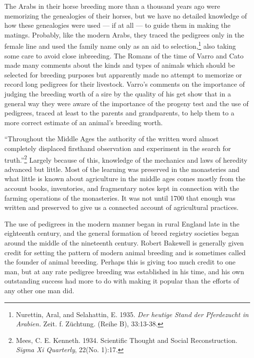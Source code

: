 The Arabs in their horse breeding more than a thousand years ago were memorizing the genealogies of their horses, but we 
have no detailed knowledge of how these genealogies were used --- if at all --- to guide them in making the matings. 
Probably, like the modern Arabs, they traced the pedigrees only in the female line and used the family name only as an aid 
to selection,\footnote{Nurettin, Aral, and Selahattin, E. 1935. \textit{Der heutige Stand der Pferdezucht in 
Arabien.} Zeit. f. Z\"{u}chtung. (Reihe B), 33:13-38.} also taking some care to avoid close inbreeding. The Romans of the 
time of Varro and Cato made many comments about the kinds and types of animals which should be selected for breeding 
purposes but apparently made no attempt to memorize or record long pedigrees for their livestock. Varro's comments on the 
importance of judging the breeding worth of a sire by the quality of his get show that in a general way they were aware of 
the importance of the progeny test and the use of pedigrees, traced at least to the parents and grandparents, to help them 
to a more correct estimate of an animal's breeding worth.

``Throughout the Middle Ages the authority of the written word almost completely displaced firsthand observation and 
experiment in the search for truth.''\footnote{Mees, C. E. Kenneth. 1934. Scientific Thought and Social Reconstruction. 
\textit{Sigma Xi Quarterly}, 22(No. 1):17.} Largely because of this, knowledge of the mechanics and laws of heredity 
advanced but little. Most of the learning was preserved in the monasteries and what little is known about agriculture in 
the middle ages comes mostly from the account books, inventories, and fragmentary notes kept in connection with the farming 
operations of the monasteries. It was not until 1700 that enough was written and preserved to give us a connected account 
of agricultural practices.

The use of pedigrees in the modern manner began in rural England late in the eighteenth century, and the general formation 
of breed registry societies began around the middle of the nineteenth century. Robert Bakewell is generally given credit 
for setting the pattern of modern animal breeding and is sometimes called the founder of animal breeding. Perhaps this is 
giving too much credit to one man, but at any rate pedigree breeding was established in his time, and his own outstanding 
success had more to do with making it popular than the efforts of any other one man did.

